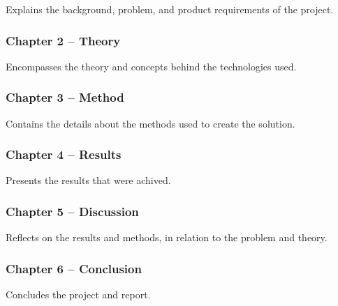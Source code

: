 Explains the background, problem, and product requirements of the project.

\subsubsection*{Chapter 2 -- Theory}

Encompasses the theory and concepts behind the technologies used.

\subsubsection*{Chapter 3 -- Method}

Contains the details about the methods used to create the solution.

\subsubsection*{Chapter 4 -- Results}

Presents the results that were achived.

\subsubsection*{Chapter 5 -- Discussion}

Reflects on the results and methods, in relation to the problem and theory.

\subsubsection*{Chapter 6 -- Conclusion}

Concludes the project and report.











